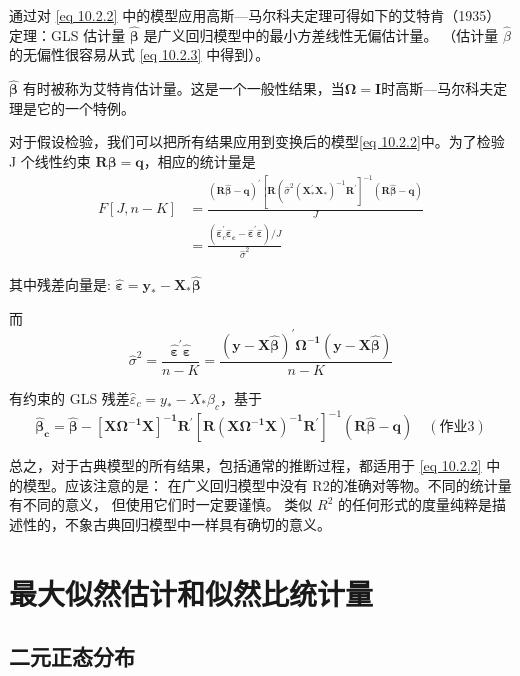 通过对 \eqref{eq 10.2.2} 中的模型应用高斯—马尔科夫定理可得如下的艾特肯（1935）定理：GLS 估计量 $ \boldsymbol{ \hat{\beta}} $ 是广义回归模型中的最小方差线性无偏估计量。
（估计量 $ \hat{\beta} $ 的无偏性很容易从式 \eqref{eq 10.2.3} 中得到）。

$ \boldsymbol{\hat{\beta}} $ 有时被称为艾特肯估计量。这是一个一般性结果，当$ \boldsymbol{\Omega = I} $时高斯—马尔科夫定理是它的一个特例。

对于假设检验，我们可以把所有结果应用到变换后的模型\eqref{eq 10.2.2}中。为了检验 J 个线性约束 $ \boldsymbol{R \beta  = q} $，相应的统计量是
$$ \begin{aligned}
    F[J, n-K] &=\frac{(\boldsymbol{R \hat{\beta}-q})^{\prime}\left[\boldsymbol{R} 
    \left(\hat{\sigma}^{2}\left( \boldsymbol{X_{*}^{\prime} X_{*}} \right)^{-1} \boldsymbol{R^{\prime}} \right]^{-1}
    ( \boldsymbol{R \hat{\beta}-q})\right.}{J} \\
    & = \frac{\left(\hat{\boldsymbol{\varepsilon}}_{c}^{\prime} 
    \boldsymbol{\hat{\varepsilon}_{c}-\hat{\varepsilon}^{\prime} \hat{\varepsilon}}\right) / J}{\hat{\sigma}^{2}}
    \end{aligned} $$ 

其中残差向量是: $ \boldsymbol{\hat{\varepsilon}=y_{*}-X_{*} \hat{\beta}} $


而
$$ \hat{\sigma}^{2} = \frac{ \boldsymbol{\hat{\varepsilon}^{\prime} \hat{\varepsilon}}}{n-K}
        =\frac{\boldsymbol{(y-X \hat{\beta})^{\prime} \Omega^{-1}(y-X \hat{\beta})}}{n-K} $$ 

有约束的 GLS 残差$ \hat{\varepsilon}_{c}=y_{*}-X_{*} \beta_{c} $，基于 
\begin{equation}
    \boldsymbol{\hat{\beta}_{c} = \hat{\beta}-\left[X \Omega^{-1} X\right]^{-1} R^{\prime}}
     \left[ \boldsymbol{R\left(X \Omega^{-1} X\right)^{-1} R^{\prime}}\right]^{-1}( \boldsymbol{R \hat{\beta}-q}) 
    \quad(\text {作业} 3)
\end{equation}

总之，对于古典模型的所有结果，包括通常的推断过程，都适用于 \eqref{eq 10.2.2} 中的模型。应该注意的是： 在广义回归模型中没有 R2的准确对等物。不同的统计量有不同的意义，
但使用它们时一定要谨慎。 类似 $ R^{2} $ 的任何形式的度量纯粹是描述性的，不象古典回归模型中一样具有确切的意义。

\section{最大似然估计和似然比统计量}
\subsection{二元正态分布}


